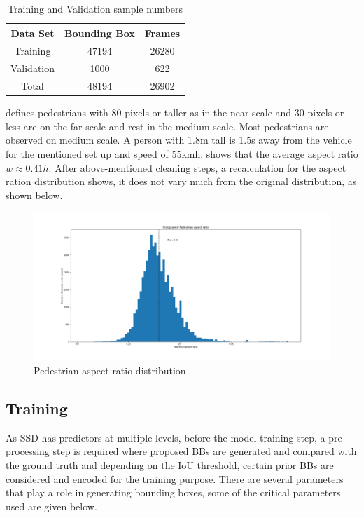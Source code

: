\begin {table}[H]
\begin{center}
 \begin{tabular}{||c c c||}
 \hline
 Data Set & Bounding Box & Frames\\ [0.8ex] 
 \hline\hline
 Training & 47194 & 26280 \\
 \hline
 Validation & 1000 & 622 \\
 \hline
 Total & 48194 & 26902 \\
 \hline
\end{tabular}
\caption{Training and Validation sample numbers}
\end{center}
\end {table}

\cite{dollar2009pedestrian} defines pedestrians with 80 pixels or taller as in the near scale and 30 pixels or less
are on the far scale and rest in the medium scale. Most pedestrians are observed on medium scale. A person with 1.8m tall is 1.5s away from the vehicle for the mentioned set up and speed of 55km\/h. \cite{dollar2011pedestrian} shows that the average aspect ratio \textit{$w \approx 0.41h$}. After above-mentioned cleaning steps, a recalculation for the aspect ration distribution shows, it does not vary much from the original distribution, as shown below.

\begin{figure}[H]
\includegraphics[scale=0.4]{aspect_ratio_distribution}
\begin{center}
\caption{Pedestrian aspect ratio distribution}
\end{center}
\end{figure}

\subsection{Training }
As SSD has predictors at multiple levels, before the model training step, a pre-processing step is required where proposed BBs are generated and compared with the ground truth and depending on the IoU threshold, certain prior BBs are considered and encoded for the training purpose. There are several parameters that play a role in generating bounding boxes, some of the critical parameters used are given below.

